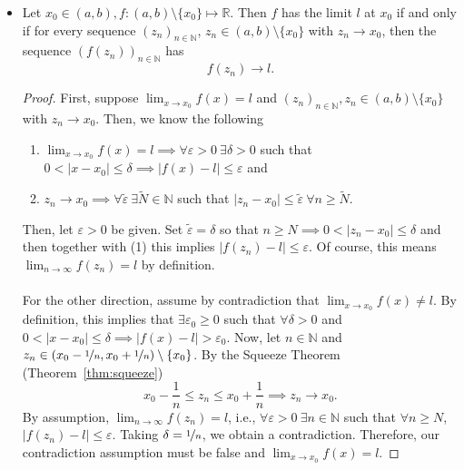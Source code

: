 \documentclass{article}
\newcommand{\R}{\mathbb{R}}
\newcommand{\N}{\mathbb{N}}
\newcommand{\seq}[2]{(#1_{#2})_{#2 \in \N}}
\newcommand{\?}{\stackrel{?}{=}}
\theoremstyle{definition} %
\begin{document}
\begin{itemize}
    \item[]
    \begin{proposition}
        Let $x_0 \in (a, b), f: (a, b) \setminus \{x_0\} \mapsto \R$. Then $f$ has the limit $l$ at $x_0$ if and only if for every sequence $\seq{z}{n}$, $z_n \in (a, b) \setminus \{x_0\}$ with $z_n \rightarrow x_0$, then the sequence $(f(z_n))_{n \in \N}$ has
        $$f(z_n) \rightarrow l.$$
        \label{prop:seq_lim}
    \end{proposition}
    \begin{proof}
        First, suppose $\lim_{x \to x_0} f(x) = l$ and $\seq{z}{n}, z_n \in (a, b) \setminus \{x_0\}$ with $z_n \rightarrow x_0$. Then, we know the following
        \begin{enumerate}[label=(\arabic*)]
            \item $\lim_{x \to x_0} f(x) = l \implies \forall \varepsilon > 0 \ \exists \delta > 0$ such that $0 < |x - x_0| \leq \delta \implies |f(x) - l| \leq \varepsilon$ and
            \item $z_n \rightarrow x_0 \implies \forall \widetilde{\varepsilon} \ \exists \widetilde{N} \in \N$ such that $|z_n - x_0| \leq \widetilde{\varepsilon} \ \forall n \geq \widetilde{N}$.
        \end{enumerate}
        Then, let $\varepsilon > 0$ be given. Set $\widetilde{\varepsilon} = \delta$ so that $n \geq N \implies 0 < |z_n - x_0| \leq \delta$ and then together with (1) this implies $|f(z_n) - l| \leq \varepsilon$. Of course, this means $\lim_{n \to \infty} f(z_n) = l$ by definition. \\\\
        For the other direction, assume by contradiction that $\lim_{x \to x_0} f(x) \neq l$. By definition, this implies that $\exists \varepsilon_0 \geq 0$ such that $\forall \delta > 0$ and $0 < |x - x_0| \leq \delta \implies |f(x) - l| > \varepsilon_0$. Now, let $n \in \N$ and $z_n \in (x_0 - \nicefrac{1}{n}, x_0 + \nicefrac{1}{n}) \setminus \{x_0\}$. By the Squeeze Theorem (Theorem~\ref{thm:squeeze})
        $$x_0 - \frac{1}{n} \leq z_n \leq x_0 + \frac{1}{n} \implies z_n \rightarrow x_0.$$
        By assumption, $\lim_{n \to \infty} f(z_n) = l$, i.e., $\forall \varepsilon > 0 \ \exists n \in \N$ such that $\forall n \geq N$, $|f(z_n) - l| \leq \varepsilon$. Taking $\delta = \nicefrac{1}{n}$, we obtain a contradiction. Therefore, our contradiction assumption must be false and $\lim_{x \to x_0} f(x) = l$.
    \end{proof}

\end{itemize}
\end{document}
